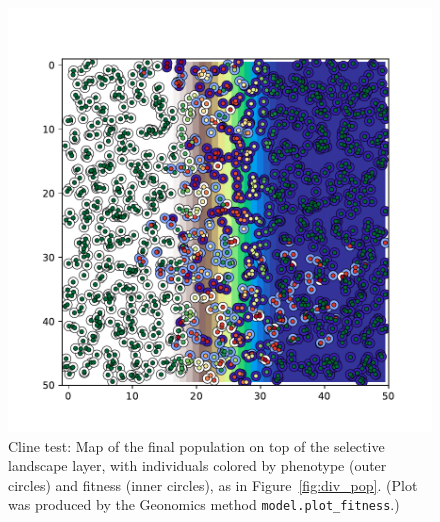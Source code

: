 ﻿\documentclass{article}
\begin{document}
\begin{figure}[ht!]
        \includegraphics[width=175mm]{./img/final/CLINE_pop_plot.pdf}
        \caption{Cline test: Map of the final population
                 on top of the selective landscape layer,
                 with individuals colored by phenotype (outer circles)
                 and fitness (inner circles), as in Figure~\ref{fig:div_pop}.
                 (Plot was produced by the Geonomics method
                 \texttt{model.plot\_fitness}.)}
        \label{fig:cline_pop}
\end{figure}
\end{document}

